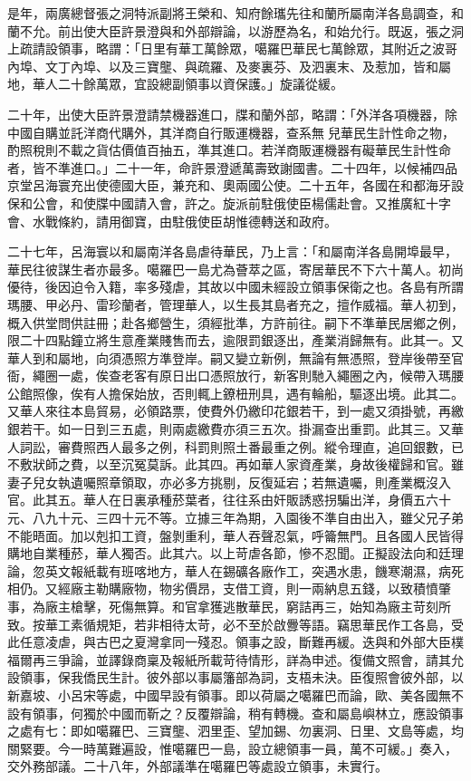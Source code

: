 \begin{pinyinscope}
是年，兩廣總督張之洞特派副將王榮和、知府餘瓗先往和蘭所屬南洋各島調查，和蘭不允。前出使大臣許景澄與和外部辯論，以游歷為名，和始允行。既返，張之洞上疏請設領事，略謂：「日里有華工萬餘眾，噶羅巴華民七萬餘眾，其附近之波哥內埠、文丁內埠、以及三寶壟、與疏羅、及麥裏芬、及泗裏末、及惹加，皆和屬地，華人二十餘萬眾，宜設總副領事以資保護。」旋議從緩。

二十年，出使大臣許景澄請禁機器進口，牒和蘭外部，略謂：「外洋各項機器，除中國自購並託洋商代購外，其洋商自行販運機器，查系無兒華民生計性命之物，酌照稅則不載之貨估價值百抽五，準其進口。若洋商販運機器有礙華民生計性命者，皆不準進口。」二十一年，命許景澄遞萬壽致謝國書。二十四年，以候補四品京堂呂海寰充出使德國大臣，兼充和、奧兩國公使。二十五年，各國在和都海牙設保和公會，和使牒中國請入會，許之。旋派前駐俄使臣楊儒赴會。又推廣紅十字會、水戰條約，請用御寶，由駐俄使臣胡惟德轉送和政府。

二十七年，呂海寰以和屬南洋各島虐待華民，乃上言：「和屬南洋各島開埠最早，華民往彼謀生者亦最多。噶羅巴一島尤為薈萃之區，寄居華民不下六十萬人。初尚優待，後因迫令入籍，率多殘虐，其故以中國未經設立領事保衛之也。各島有所謂瑪腰、甲必丹、雷珍蘭者，管理華人，以生長其島者充之，擅作威福。華人初到，概入供堂問供註冊；赴各鄉營生，須經批準，方許前往。嗣下不準華民居鄉之例，限二十四點鐘立將生意產業賤售而去，逾限罰銀逐出，產業消歸無有。此其一。又華人到和屬地，向須憑照方準登岸。嗣又變立新例，無論有無憑照，登岸後帶至官衙，繩圈一處，俟查老客有原日出口憑照放行，新客則馳入繩圈之內，候帶入瑪腰公館照像，俟有人擔保始放，否則輒上鐐杻刑具，遇有輪船，驅逐出境。此其二。又華人來往本島貿易，必領路票，使費外仍繳印花銀若干，到一處又須掛號，再繳銀若干。如一日到三五處，則兩處繳費亦須三五次。掛漏查出重罰。此其三。又華人詞訟，審費照西人最多之例，科罰則照土番最重之例。縱令理直，追回銀數，已不敷狀師之費，以至沉冤莫訴。此其四。再如華人家資產業，身故後權歸和官。雖妻子兒女執遺囑照章領取，亦必多方挑剔，反復延宕；若無遺囑，則產業概沒入官。此其五。華人在日裏承種菸葉者，往往系由奸販誘惑拐騙出洋，身價五六十元、八九十元、三四十元不等。立據三年為期，入園後不準自由出入，雖父兄子弟不能晤面。加以剋扣工資，盤剝重利，華人吞聲忍氣，呼籥無門。且各國人民皆得購地自業種菸，華人獨否。此其六。以上苛虐各節，慘不忍聞。正擬設法向和廷理論，忽英文報紙載有班喀地方，華人在錫礦各廠作工，突遇水患，饑寒潮濕，病死相仍。又經廠主勒購廠物，物劣價昂，支借工資，則一兩納息五錢，以致積憤肇事，為廠主槍擊，死傷無算。和官拿獲逃散華民，窮詰再三，始知為廠主苛刻所致。按華工素循規矩，若非相待太苛，必不至於啟釁等語。竊思華民作工各島，受此任意凌虐，與古巴之夏灣拿同一殘忍。領事之設，斷難再緩。迭與和外部大臣樸福爾再三爭論，並譯錄商稟及報紙所載苛待情形，詳為申述。復備文照會，請其允設領事，保我僑民生計。彼外部以事屬籓部為詞，支梧未決。臣復照會彼外部，以新嘉坡、小呂宋等處，中國早設有領事。即以荷屬之噶羅巴而論，歐、美各國無不設有領事，何獨於中國而靳之？反覆辯論，稍有轉機。查和屬島嶼林立，應設領事之處有七：即如噶羅巴、三寶壟、泗里歪、望加錫、勿裏洞、日里、文島等處，均關緊要。今一時萬難遍設，惟噶羅巴一島，設立總領事一員，萬不可緩。」奏入，交外務部議。二十八年，外部議準在噶羅巴等處設立領事，未實行。


\end{pinyinscope}
